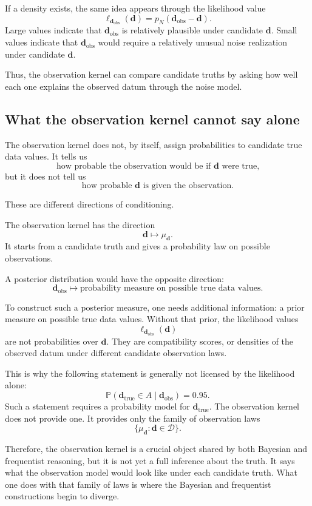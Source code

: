 \documentclass[11pt]{article}
\newcommand{\Dspace}{\mathcal D}
\newcommand{\dtrue}{\mathbf d_{\mathrm{true}}}
\newcommand{\dobs}{\mathbf d_{\mathrm{obs}}}
\newcommand{\Prob}{\mathbb P}
\begin{document}
If a density exists, the same idea appears through the likelihood value
\[
    \ell_{\dobs}(\mathbf d)
    =
    p_N(\dobs-\mathbf d).
\]
Large values indicate that \(\dobs\) is relatively plausible under candidate \(\mathbf d\). Small values indicate that \(\dobs\) would require a relatively unusual noise realization under candidate \(\mathbf d\).

Thus, the observation kernel can compare candidate truths by asking how well each one explains the observed datum through the noise model.

\subsection{What the observation kernel cannot say alone}

The observation kernel does not, by itself, assign probabilities to candidate true data values. It tells us
\[
    \text{how probable the observation would be if } \mathbf d \text{ were true,}
\]
but it does not tell us
\[
    \text{how probable } \mathbf d \text{ is given the observation.}
\]

These are different directions of conditioning.

The observation kernel has the direction
\[
    \mathbf d
    \longmapsto
    \mu_{\mathbf d}.
\]
It starts from a candidate truth and gives a probability law on possible observations.

A posterior distribution would have the opposite direction:
\[
    \dobs
    \longmapsto
    \text{probability measure on possible true data values}.
\]

To construct such a posterior measure, one needs additional information: a prior measure on possible true data values. Without that prior, the likelihood values
\[
    \ell_{\dobs}(\mathbf d)
\]
are not probabilities over \(\mathbf d\). They are compatibility scores, or densities of the observed datum under different candidate observation laws.

This is why the following statement is generally not licensed by the likelihood alone:
\[
    \Prob(\dtrue\in A\mid \dobs)=0.95.
\]
Such a statement requires a probability model for \(\dtrue\). The observation kernel does not provide one. It provides only the family of observation laws
\[
    \{\mu_{\mathbf d}:\mathbf d\in\Dspace\}.
\]

Therefore, the observation kernel is a crucial object shared by both Bayesian and frequentist reasoning, but it is not yet a full inference about the truth. It says what the observation model would look like under each candidate truth. What one does with that family of laws is where the Bayesian and frequentist constructions begin to diverge.
\end{document}
